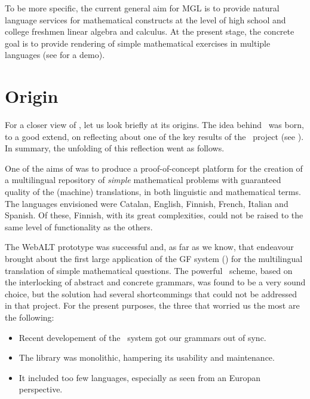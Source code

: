\documentclass[adraft,copyright,creativecommons]{eptcs}
\begin{document}
To be more specific, the current general aim for MGL is to provide natural
language services for mathematical constructs at the level of high school
and college freshmen linear algebra and calculus.  At the present stage,
the concrete goal is to provide rendering of simple mathematical exercises
in multiple languages (see \cite{MathBar} for a demo).



\section{Origin}

For a closer view of \MGL, let us look briefly at its origins.  The
idea behind \MGL\ was born, to a good extend, on reflecting about one of
the key results of the \webalt\ project (see
\cite{Caprotti_multilingualdelivery, Caprotti06webalt!deliver, Nganga06}).  In
summary, the unfolding of this reflection went as follows.

One of the aims of \webalt{} was to produce a proof-of-concept
platform for the creation of a multilingual repository of \emph{simple}
mathematical problems with guaranteed quality of the (machine)
translations, in both linguistic and mathematical terms. The languages
envisioned were Catalan,
English,
Finnish,
French,
Italian and
Spanish.
Of these, Finnish, with its great complexities, could not be raised to
the same level of functionality as the others.

The WebALT prototype was successful and, as far as we know, that endeavour
brought about the first large application of the GF system (\cite{GF,Ranta11})
for the multilingual translation of simple mathematical questions.  The
powerful \GF\ scheme, based on the interlocking of abstract and
concrete grammars, was found to be a very sound choice, but the solution
had several shortcommings that could not be addressed in that project.
For the present purposes, the three that worried us the most are the
following:
\begin{itemize}
\item
Recent developement of the \GF\ system got our grammars out of sync.
\item
The library was monolithic, hampering its usability and maintenance.
\item
It included too few languages, especially as seen from an Europan
perspective.
\end{itemize}
\end{document}
